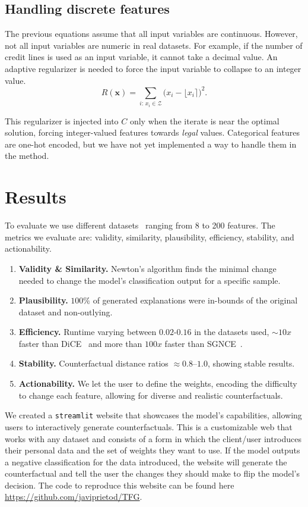 \documentclass[12pt]{extarticle}
\numberwithin{equation}{section}
\begin{document}
\subsection*{Handling discrete features}
The previous equations assume that all input variables are continuous. However, not all input variables are numeric in real datasets. For example, if the number of credit lines is used as an input variable, it cannot take a decimal value. An adaptive regularizer is needed to force the input variable to collapse to an integer value.
\[
R(\mathbf{x})=\sum_{i:\, x_i\in \mathcal{Z}}\bigl(x_i-\lfloor x_i\rceil\bigr)^2.
\]

This regularizer is injected into $C$ only when the iterate is near the optimal solution, forcing integer-valued features towards \emph{legal} values. Categorical features are one-hot encoded, but we have not yet implemented a way to handle them in the method.

\section*{Results}
To evaluate we use different datasets~\cite{kaggleLoan1_res,spambase_res,santander_res} ranging from 8 to 200 features. The metrics we evaluate are: validity, similarity, plausibility, efficiency, stability, and actionability.
\begin{enumerate}
    \item \textbf{Validity \& Similarity.} Newton's algorithm finds the minimal change needed to change the model's classification output for a specific sample. 
    \item \textbf{Plausibility.} $100\%$ of generated explanations were in-bounds of the original dataset and non-outlying.  
    \item \textbf{Efficiency.} Runtime varying between $0.02$-$0.16$ in the datasets used, $\sim10x$ faster than DiCE~\cite{dice_res} and more than $100x$ faster than SGNCE~\cite{sgnce_res}.
    \item \textbf{Stability.} Counterfactual distance ratios $\approx0.8$–$1.0$, showing stable results.
    \item \textbf{Actionability.} We let the user to define the weights, encoding the difficulty to change each feature, allowing for diverse and realistic counterfactuals.
\end{enumerate}

We created a \texttt{streamlit} website that showcases the model's capabilities, allowing users to interactively generate counterfactuals. This is a customizable web that works with any dataset and consists of a form in which the client/user introduces their personal data and the set of weights they want to use. If the model outputs a negative classification for the data introduced, the website will generate the counterfactual and tell the user the changes they should make to flip the model's decision. The code to reproduce this website can be found here \url{https://github.com/javiprietod/TFG}.
\end{document}
